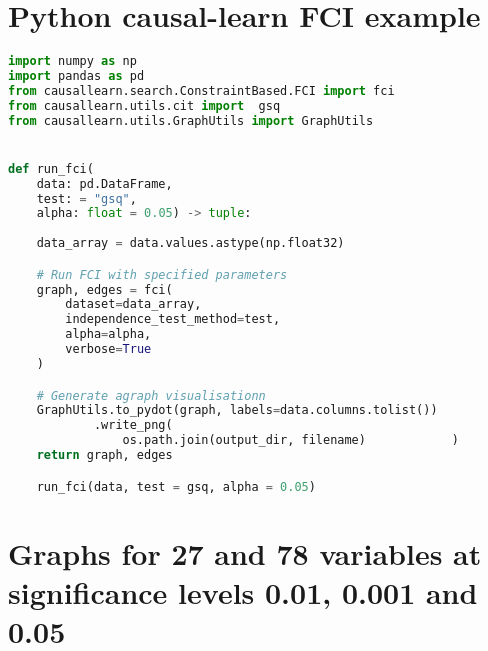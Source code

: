 \documentclass[main.tex]{subfiles}
\begin{document}
\section{Python causal-learn FCI example}
\label{appendix: python_fci_clean}
\small \begin{lstlisting}[language=Python,]
import numpy as np
import pandas as pd
from causallearn.search.ConstraintBased.FCI import fci
from causallearn.utils.cit import  gsq
from causallearn.utils.GraphUtils import GraphUtils


def run_fci(
    data: pd.DataFrame,
    test: = "gsq",
    alpha: float = 0.05) -> tuple:
    
    data_array = data.values.astype(np.float32)

    # Run FCI with specified parameters
    graph, edges = fci(
        dataset=data_array,
        independence_test_method=test,
        alpha=alpha,
        verbose=True
    )

    # Generate agraph visualisationn
    GraphUtils.to_pydot(graph, labels=data.columns.tolist())
            .write_png(
                os.path.join(output_dir, filename)            )
    return graph, edges

    run_fci(data, test = gsq, alpha = 0.05)
\end{lstlisting}




\section{Graphs for 27 and 78 variables at significance levels 0.01, 0.001 and 0.05}
\label{appendix: 78_fci_pictures}











\begin{landscape}

\end{landscape}

\begin{landscape}

\end{landscape}

\begin{landscape}

\end{landscape}
\end{document}
